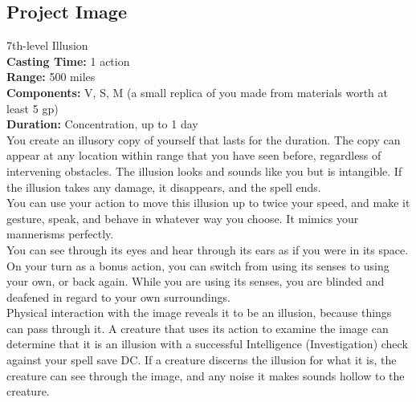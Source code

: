 \documentclass[11pt, A4paper, english]{article}
\begin{document}
		\subsection{Project Image}
7th-level Illusion \\
\textbf{Casting Time:} 1 action \\
\textbf{Range:} 500 miles \\
\textbf{Components:} V, S, M (a small replica of you made from materials worth at least 5 gp) \\
\textbf{Duration:} Concentration, up to 1 day \\
You create an illusory copy of yourself that lasts for the duration. The copy can appear at any location within range that you have seen before, regardless of intervening obstacles. The illusion looks and sounds like you but is intangible. If the illusion takes any damage, it disappears, and the spell ends. \\
You can use your action to move this illusion up to twice your speed, and make it gesture, speak, and behave in whatever way you choose. It mimics your mannerisms perfectly. \\
You can see through its eyes and hear through its ears as if you were in its space. On your turn as a bonus action, you can switch from using its senses to using your own, or back again. While you are using its senses, you are blinded and deafened in regard to your own surroundings. \\
Physical interaction with the image reveals it to be an illusion, because things can pass through it. A creature that uses its action to examine the image can determine that it is an illusion with a successful Intelligence (Investigation) check against your spell save DC. If a creature discerns the illusion for what it is, the creature can see through the image, and any noise it makes sounds hollow to the creature.
\end{document}
